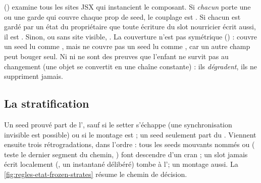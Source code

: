 
 () examine tous les sites JSX qui instancient le composant. Si \emph{chacun} porte une  ou une garde qui couvre chaque prop de seed, le couplage est . Si chacun est gardé par un état du propriétaire que toute écriture du slot nourricier écrit aussi, il est . Sinon, ou sans site visible, . La couverture n'est pas symétrique () :  couvre un seed lu comme , mais  ne couvre pas un seed lu comme , car un autre champ peut bouger seul. Ni  ni  ne sont des preuves que l'enfant ne survit pas au changement (une  objet se convertit en une chaîne constante) : ils \emph{dégradent}, ils ne suppriment jamais.

\subsection{La stratification}



Un seed prouvé part de l'\Error, sauf si le setter s'échappe (une synchronisation invisible est possible) ou si le montage est  ; un seed seulement  part du \Warning. Viennent ensuite trois rétrogradations, dans l'ordre : tous les seeds mouvants nommés  ou  ( teste le dernier segment du chemin, ) font descendre d'un cran ; un slot jamais écrit localement (, un instantané délibéré) tombe à l'\Info ; un montage  aussi. La \cref{fig:regles-etat-frozen-strates} résume le chemin de décision.


